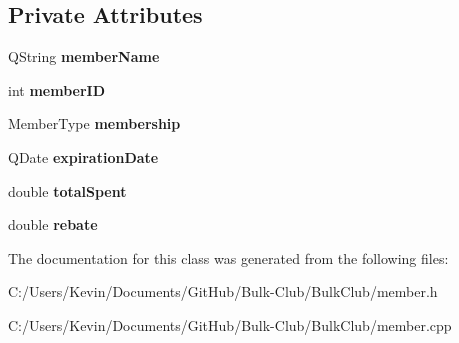 \subsection*{Private Attributes}
\begin{DoxyCompactItemize}
\item 
\mbox{\label{class_member_af0efc05d5ee8d89cc6b3bd588bcb9139}} 
Q\+String {\bfseries member\+Name}
\item 
\mbox{\label{class_member_a8a938869fd648e0625eefa6bd38b2c06}} 
int {\bfseries member\+ID}
\item 
\mbox{\label{class_member_ab283f12cb682b78f0524850f53f9d36b}} 
Member\+Type {\bfseries membership}
\item 
\mbox{\label{class_member_a697e8d1fc0417da55627350df5e02b47}} 
Q\+Date {\bfseries expiration\+Date}
\item 
\mbox{\label{class_member_ab2ca88932004e0c2005bbf837a5d6d58}} 
double {\bfseries total\+Spent}
\item 
\mbox{\label{class_member_a351d6d0f9eafd12525300d937bb4438b}} 
double {\bfseries rebate}
\end{DoxyCompactItemize}


The documentation for this class was generated from the following files\+:\begin{DoxyCompactItemize}
\item 
C\+:/\+Users/\+Kevin/\+Documents/\+Git\+Hub/\+Bulk-\/\+Club/\+Bulk\+Club/member.\+h\item 
C\+:/\+Users/\+Kevin/\+Documents/\+Git\+Hub/\+Bulk-\/\+Club/\+Bulk\+Club/member.\+cpp\end{DoxyCompactItemize}
